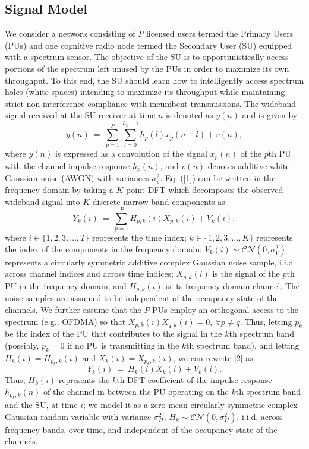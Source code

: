 \documentclass[10pt,twocolumn]{IEEEtran}
\begin{document}
\subsection{Signal Model}\label{A}
We consider a network consisting of $P$ licensed users termed the Primary Users (PUs) and one cognitive radio node termed the Secondary User (SU) equipped with a spectrum sensor. The objective of the SU is to opportunistically access portions of the spectrum left unused by the PUs in order to maximize its own throughput. To this end, the SU should learn how to intelligently access spectrum holes (white-spaces) intending to maximize its throughput while maintaining strict non-interference compliance with incumbent transmissions.
The wideband signal received at the SU receiver at time $n$ is denoted as $y(n)$ and is given by 
\begin{equation}\label{1}
    y(n)\ =\ \sum_{p=1}^{P}\sum_{l=0}^{L_{p}-1} h_{p}(l)x_{p}(n-l) + v(n),
\end{equation}
where $y(n)$ is expressed as a convolution of the signal $x_{p}(n)$ of the $p$th PU with the channel impulse response $h_{p}(n)$, and $v(n)$ denotes additive white Gaussian noise (AWGN) with variances $\sigma_v^2$. Eq. (\ref{1}) can be written in the frequency domain by taking a $K$-point DFT which decomposes the observed wideband signal into $K$ discrete narrow-band components as 
\begin{equation}\label{2}
    Y_k(i)\ =\ \sum_{p=1}^{P}H_{p,k}(i)X_{p,k}(i)+V_k(i),
\end{equation}
where $i \in \{1,2,3,\dots,T\}$ represents the time index; $k \in \{1,2,3,\dots,K\}$ represents the index of the components in the frequency domain; $V_k(i) \sim \mathcal{CN}(0,\sigma_V^2)$ represents a circularly symmetric additive complex Gaussian noise sample, i.i.d across channel indices and across time indices; $X_{p,k}(i)$ is the signal of the $p$th PU in the frequency domain, and $H_{p,k}(i)$ is its frequency domain channel. The noise samples are assumed to be independent of the occupancy state of the channels. We further assume that the $P$ PUs employ an orthogonal access to the spectrum (e.g., OFDMA) so that $X_{p,k}(i)X_{q,k}(i)=0,\ \forall p\neq q$. Thus, letting $p_k$ be the index of the PU that contributes to the signal in the $k$th spectrum band (possibly, $p_k=0$ if no PU is transmitting in the $k$th spectrum band), and letting  $H_{k}(i)=H_{p_k,k}(i)$ and $X_{k}(i)=X_{p_k,k}(i)$, we can rewrite \eqref{2} as 
\begin{equation}\label{3}
    Y_k(i)\ =\ H_{k}(i)X_{k}(i) + V_k(i).
\end{equation}
Thus, $H_k(i)$ represents the $k$th DFT coefficient of the impulse response $h_{p_k,k}(n)$ of the channel in between the PU operating on the $k$th spectrum band and the SU, at time $i$; we model it as a zero-mean circularly symmetric complex Gaussian random variable with variance $\sigma_H^2$, $H_k \sim \mathcal{CN}(0,\sigma_H^2)$, i.i.d. across frequency bands, over time, and independent of the occupancy state of the channels.
\end{document}
